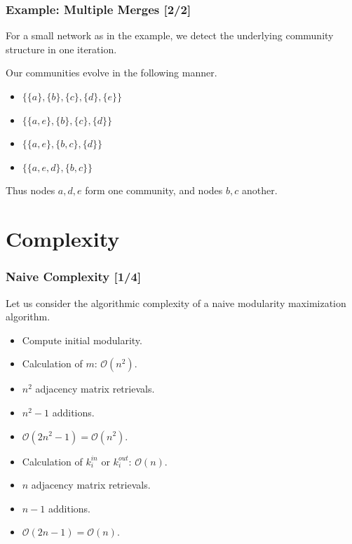 \documentclass{beamer}
\begin{document}
\begin{frame}

    \frametitle{Example: Multiple Merges [2/2]}

    For a small network as in the example, we detect the underlying community structure in one iteration.\pause

    \vspace{2.5mm}
    Our communities evolve in the following manner.\pause

    \vspace{2.5mm}
    \begin{itemize}
        \item $ \{ \{a\}, \{b\}, \{c\}, \{d\}, \{e\} \}$\pause
        \item $ \{ \{a, e\}, \{b\}, \{c\}, \{d\} \}$\pause
        \item $ \{ \{a, e\}, \{b, c\}, \{d\} \}$\pause
        \item $ \{ \{a, e, d\}, \{b, c\} \}$\pause
    \end{itemize}

    \vspace{2.5mm}
    Thus nodes $ a, d, e $ form one community, and nodes $ b, c $ another.

\end{frame}


\section{Complexity}

\begin{frame}

    \frametitle{Naive Complexity [1/4]}

    Let us consider the algorithmic complexity of a naive modularity maximization algorithm.\pause

    \vspace{2.5mm}
    \begin{itemize}
        \item Compute initial modularity.\pause
        \item[$\diamond$] Calculation of $ m $: $ \mathcal{O}(n^{2}) $.\pause
        \item[$\ast$] $ n^{2} $ adjacency matrix retrievals.\pause
        \item[$\ast$] $ n^{2} - 1 $ additions.\pause
        \item[$\ast$] $ \mathcal{O}(2n^{2} - 1) = \mathcal{O}(n^{2}) $.\pause
        \item[$\diamond$] Calculation of $ k_{i}^{in} $ or $ k_{i}^{out} $: $ \mathcal{O}(n) $.\pause
        \item[$\ast$] $ n $ adjacency matrix retrievals.\pause
        \item[$\ast$] $ n - 1 $ additions.\pause
        \item[$\ast$] $ \mathcal{O}(2n - 1) = \mathcal{O}(n) $.
    \end{itemize}

\end{frame}
\end{document}
